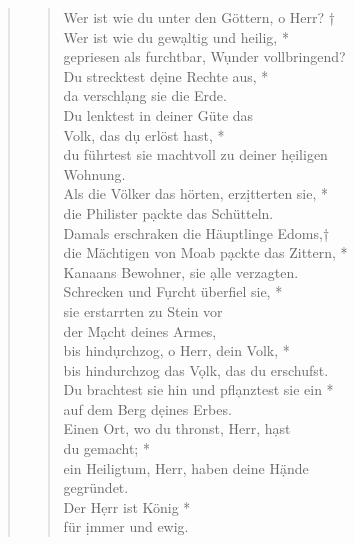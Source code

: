 \begin{quote}
\begin{verse}
\vspace{0.3cm}


\vspace{0.3cm}

Wer ist wie du unter den Göttern, o Herr? †\\
Wer ist wie du gew\d altig und heilig, *\\ gepriesen als furchtbar, W\d under vollbringend?\\
\vin Du strecktest d\d eine Rechte aus, *\\
\vin da verschl\d ang sie die Erde.\\
Du lenktest in deiner Güte das\\  Volk, das d\d u erlöst hast, *\\
du führtest sie machtvoll zu deiner h\d eiligen \\Wohnung.\\
\vin Als die Völker das hörten, erz\d itterten sie, *\\
\vin die Philister p\d ackte das Schütteln.\\
Damals erschraken die Häuptlinge Edoms,†\\
die Mächtigen von Moab p\d ackte das Zittern, *\\ Kanaans Bewohner, sie \d alle verzagten.\\
\vin Schrecken und F\d urcht überfiel sie, *\\
\vin sie erstarrten zu Stein vor\\ \vin der M\d acht deines Armes, \\
bis hind\d urchzog, o Herr, dein Volk, *\\ bis hindurchzog das V\d olk, das du erschufst.\\
\vin Du brachtest sie hin und  pfl\d anztest sie ein *\\ \vin auf dem Berg d\d eines Erbes.\\
 Einen Ort, wo du thronst, Herr, h\d ast \\du gemacht; *\\ ein Heiligtum, Herr, haben deine  H\d ände \\gegründet.\\
\vin Der H\d err ist König *\\ \vin für \d immer und ewig. \\

\end{verse}
\end{quote}
\vspace{0.3cm}

